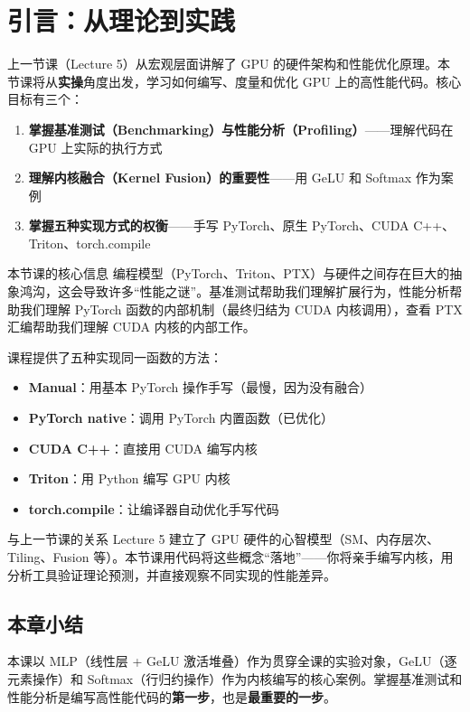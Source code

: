 \section{引言：从理论到实践}

上一节课（Lecture 5）从宏观层面讲解了 GPU 的硬件架构和性能优化原理。本节课将从\textbf{实操}角度出发，学习如何编写、度量和优化 GPU 上的高性能代码。核心目标有三个：

\begin{enumerate}
    \item \textbf{掌握基准测试（Benchmarking）与性能分析（Profiling）}——理解代码在 GPU 上实际的执行方式
    \item \textbf{理解内核融合（Kernel Fusion）的重要性}——用 GeLU 和 Softmax 作为案例
    \item \textbf{掌握五种实现方式的权衡}——手写 PyTorch、原生 PyTorch、CUDA C++、Triton、torch.compile
\end{enumerate}

\begin{importantbox}{本节课的核心信息}
编程模型（PyTorch、Triton、PTX）与硬件之间存在巨大的抽象鸿沟，这会导致许多``性能之谜''。基准测试帮助我们理解扩展行为，性能分析帮助我们理解 PyTorch 函数的内部机制（最终归结为 CUDA 内核调用），查看 PTX 汇编帮助我们理解 CUDA 内核的内部工作。
\end{importantbox}

课程提供了五种实现同一函数的方法：
\begin{itemize}
    \item \textbf{Manual}：用基本 PyTorch 操作手写（最慢，因为没有融合）
    \item \textbf{PyTorch native}：调用 PyTorch 内置函数（已优化）
    \item \textbf{CUDA C++}：直接用 CUDA 编写内核
    \item \textbf{Triton}：用 Python 编写 GPU 内核
    \item \textbf{torch.compile}：让编译器自动优化手写代码
\end{itemize}

\begin{knowledgebox}{与上一节课的关系}
Lecture 5 建立了 GPU 硬件的心智模型（SM、内存层次、Tiling、Fusion 等）。本节课用代码将这些概念``落地''——你将亲手编写内核，用分析工具验证理论预测，并直接观察不同实现的性能差异。
\end{knowledgebox}

\subsection{本章小结}

本课以 MLP（线性层 + GeLU 激活堆叠）作为贯穿全课的实验对象，GeLU（逐元素操作）和 Softmax（行归约操作）作为内核编写的核心案例。掌握基准测试和性能分析是编写高性能代码的\textbf{第一步}，也是\textbf{最重要的一步}。


